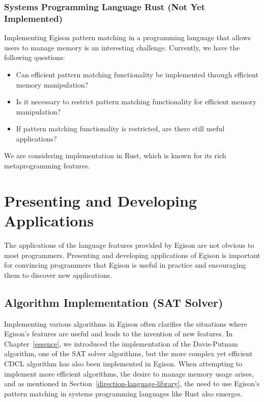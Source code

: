 \subsubsection{Systems Programming Language Rust (Not Yet Implemented)}\label{direction-language-rust}

Implementing Egison pattern matching in a programming language that allows users to manage memory is an interesting challenge.
Currently, we have the following questions:
\begin{itemize}
\item Can efficient pattern matching functionality be implemented through efficient memory manipulation?
\item Is it necessary to restrict pattern matching functionality for efficient memory manipulation?
\item If pattern matching functionality is restricted, are there still useful applications?
\end{itemize}
We are considering implementation in Rust, which is known for its rich metaprogramming features.

\section{Presenting and Developing Applications}\label{application}

The applications of the language features provided by Egison are not obvious to most programmers.
Presenting and developing applications of Egison is important for convincing programmers that Egison is useful in practice and encouraging them to discover new applications.

\subsection{Algorithm Implementation (SAT Solver)}

Implementing various algorithms in Egison often clarifies the situations where Egison's features are useful and leads to the invention of new features.
In Chapter~\ref{essence}, we introduced the implementation of the Davis-Putnam algorithm, one of the SAT solver algorithms, but the more complex yet efficient CDCL algorithm has also been implemented in Egison.
When attempting to implement more efficient algorithms, the desire to manage memory usage arises, and as mentioned in Section~\ref{direction-language-library}, the need to use Egison's pattern matching in systems programming languages like Rust also emerges.

